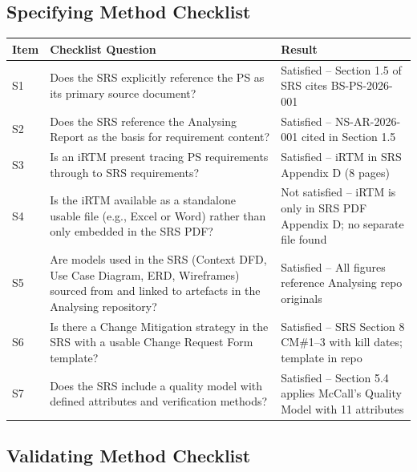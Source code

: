 \documentclass[11pt,a4paper]{article}
\begin{document}
\subsection{Specifying Method Checklist}

\begin{longtable}{|p{}|p{}|p{}|}
\hline
\rowcolor{tableheader}
\textbf{Item} & \textbf{Checklist Question} & \textbf{Result} \\
\hline
\endhead

S1 & Does the SRS explicitly reference the PS as its primary source document? & Satisfied -- Section 1.5 of SRS cites BS-PS-2026-001 \\
\hline
S2 & Does the SRS reference the Analysing Report as the basis for requirement content? & Satisfied -- NS-AR-2026-001 cited in Section 1.5 \\
\hline
S3 & Is an iRTM present tracing PS requirements through to SRS requirements? & Satisfied -- iRTM in SRS Appendix D (8 pages) \\
\hline
S4 & Is the iRTM available as a standalone usable file (e.g., Excel or Word) rather than only embedded in the SRS PDF? & Not satisfied -- iRTM is only in SRS PDF Appendix D; no separate file found \\
\hline
S5 & Are models used in the SRS (Context DFD, Use Case Diagram, ERD, Wireframes) sourced from and linked to artefacts in the Analysing repository? & Satisfied -- All figures reference Analysing repo originals \\
\hline
S6 & Is there a Change Mitigation strategy in the SRS with a usable Change Request Form template? & Satisfied -- SRS Section 8 CM\#1--3 with kill dates; template in repo \\
\hline
S7 & Does the SRS include a quality model with defined attributes and verification methods? & Satisfied -- Section 5.4 applies McCall's Quality Model with 11 attributes \\
\hline
\end{longtable}

\subsection{Validating Method Checklist}
\end{document}
